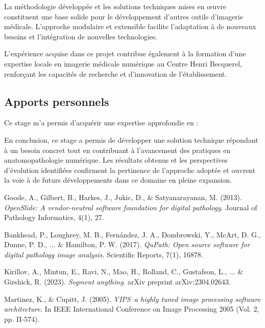 \documentclass[12pt,a4paper]{report}
\begin{document}
\begin{}
\begin{}
\begin{}
\begin{}
La méthodologie développée et les solutions techniques mises en œuvre constituent une base solide pour le développement d'autres outils d'imagerie médicale. L'approche modulaire et extensible facilite l'adaptation à de nouveaux besoins et l'intégration de nouvelles technologies.

L'expérience acquise dans ce projet contribue également à la formation d'une expertise locale en imagerie médicale numérique au Centre Henri Becquerel, renforçant les capacités de recherche et d'innovation de l'établissement.

\subsection{Apports personnels}

\begin{center}
Ce stage m'a permis d'acquérir une expertise approfondie en :
\end{center}

\vspace{0.5em}

En conclusion, ce stage a permis de développer une solution technique répondant à un besoin concret tout en contribuant à l'avancement des pratiques en anatomopathologie numérique. Les résultats obtenus et les perspectives d'évolution identifiées confirment la pertinence de l'approche adoptée et ouvrent la voie à de futurs développements dans ce domaine en pleine expansion.

\begin{thebibliography}{20}

Goode, A., Gilbert, B., Harkes, J., Jukic, D., \& Satyanarayanan, M. (2013). 
\textit{OpenSlide: A vendor-neutral software foundation for digital pathology}. 
Journal of Pathology Informatics, 4(1), 27.

Bankhead, P., Loughrey, M. B., Fernández, J. A., Dombrowski, Y., McArt, D. G., Dunne, P. D., ... \& Hamilton, P. W. (2017). 
\textit{QuPath: Open source software for digital pathology image analysis}. 
Scientific Reports, 7(1), 16878.

Kirillov, A., Mintun, E., Ravi, N., Mao, H., Rolland, C., Gustafson, L., ... \& Girshick, R. (2023). 
\textit{Segment anything}. 
arXiv preprint arXiv:2304.02643.

Martinez, K., \& Cupitt, J. (2005). 
\textit{VIPS–a highly tuned image processing software architecture}. 
In IEEE International Conference on Image Processing 2005 (Vol. 2, pp. II-574).


\end{thebibliography}
\end{}
\end{}
\end{}
\end{}
\end{document}
